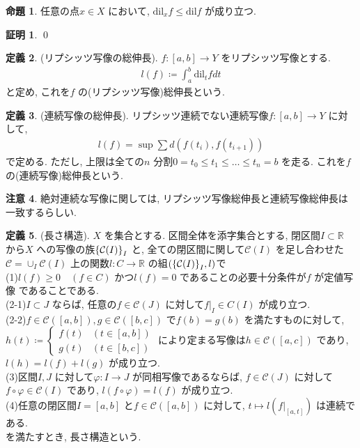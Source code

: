 \documentclass[10pt, fleqn, label-section=none]{bxjsarticle}
\theoremstyle{definition}
\newtheorem{dfn}{定義}[section]
\newtheorem{prop}[dfn]{命題}
\newtheorem*{pf*}{証明}
\newtheorem{remark}[dfn]{注意}
\newcommand{\cbra}[1]{\mleft\{#1\mright\}}
\renewcommand{\;}{\, ; \,}
\begin{document}
\begin{prop}
任意の点$x \in X$ において, $\textrm{dil}_x f \leq \textrm{dil} f$ が成り立つ. 
\end{prop}
\begin{pf*}

\qed
\end{pf*}


\begin{dfn}(リプシッツ写像の総伸長). $f : [a, b] \rightarrow Y$ をリプシッツ写像とする. 
\begin{align*} l(f) \coloneqq \int_a^b \textrm{dil} _t f dt \end{align*} 
と定め, これを$f$ の(リプシッツ写像)総伸長という. 
\end{dfn}

\begin{dfn}(連続写像の総伸長). 
リプシッツ連続でない連続写像$f : [a, b] \rightarrow Y$ に対して, 
\begin{align*} l(f) = \sup \sum d(f(t_i), f(t_{i+1}))  \end{align*}
で定める. ただし, 上限は全ての$n$ 分割$0 = t_0 \leq t_1 \leq  \ldots \leq t_n = b $ を走る. これを$f$ の(連続写像)総伸長という.
\end{dfn}

\begin{remark}
絶対連続な写像に関しては, リプシッツ写像総伸長と連続写像総伸長は一致するらしい. 
\end{remark}



\begin{dfn}(長さ構造). $X$ を集合とする. 区間全体を添字集合とする, 閉区間$I \subset \mathbb R$ から$X$  への写像の族$\cbra{\mathcal C(I)}_I$ と, 全ての閉区間に関して$\mathcal C (I)$ を足し合わせた$\mathcal C = \cup_{I} \mathcal C (I)$ 上の関数$l: C \rightarrow \mathbb R$ の組$(\cbra{\mathcal C(I)}_I, l)$で\\
(1)$l(f) \geq0 \quad (f \in C)$ かつ$l(f) = 0$ であることの必要十分条件が$f$ が定値写像 であることである. \\
(2-1)$I \subset J $ ならば, 任意の$f \in \mathcal C(J)$ に対して$f |_I \in C(I)$ が成り立つ.  \\
(2-2)$f \in \mathcal C([a,b]), g \in \mathcal C([b,c])$ で$f(b) = g(b)$ を満たすものに対して, $h(t) \coloneqq \begin{cases} f(t) &(t \in [a,b]) \\ g(t) &(t \in [b,c])\end{cases} $ により定まる写像は$h \in \mathcal C([a,c])$ であり, $l(h) = l(f) + l(g)$ が成り立つ. \\
(3)区間$I, J$ に対して$\varphi : I \rightarrow J$ が同相写像であるならば, $f \in \mathcal C(J)$ に対して$f \circ \varphi \in \mathcal C(I)$ であり, $l(f\circ \varphi) = l(f)$ が成り立つ. \\
(4)任意の閉区間$I = [a, b]$ と$f \in \mathcal C([a,b])$ に対して, $t \mapsto l(f|_{[a, t]})$ は連続である. \\
を満たすとき, 長さ構造という. 

\end{dfn}
\end{document}
